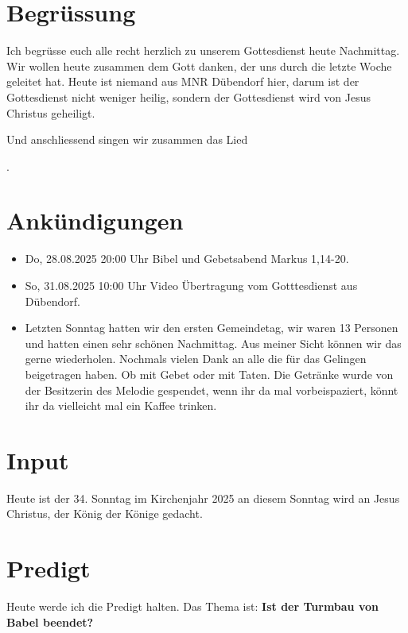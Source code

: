 \documentclass{../../inc/mybib}
\begin{document}
\section{Begrüssung}
Ich begrüsse euch alle recht herzlich zu unserem Gottesdienst heute Nachmittag. Wir wollen heute zusammen dem Gott danken, der uns durch die letzte Woche geleitet hat. Heute ist niemand aus MNR Dübendorf hier, darum ist der Gottesdienst nicht weniger heilig, sondern der Gottesdienst wird von Jesus Christus geheiligt.

\beten{} Und anschliessend singen wir zusammen das Lied

{}.

\section{Ankündigungen}
\begin{itemize}
    \item {} Do, 28.08.2025 20:00 Uhr Bibel und Gebetsabend Markus 1,14-20.
    \item {} So, 31.08.2025 10:00 Uhr Video Übertragung vom Gotttesdienst aus Dübendorf.
    \item {} Letzten Sonntag hatten wir den ersten Gemeindetag, wir waren 13 Personen und hatten einen sehr schönen Nachmittag. Aus meiner Sicht können wir das gerne wiederholen. Nochmals vielen Dank an alle die für das Gelingen beigetragen haben. Ob mit Gebet oder mit Taten. Die Getränke wurde von der Besitzerin des Melodie gespendet, wenn ihr da mal vorbeispaziert, könnt ihr da vielleicht mal ein Kaffee trinken.
\end{itemize}

\section{ Input }
\begin{spacing}{1.5}
   Heute ist der 34. Sonntag im Kirchenjahr 2025 an diesem Sonntag wird an Jesus Christus, der König der Könige gedacht. 
\end{spacing}

\section{Predigt}

Heute werde ich die Predigt halten. Das Thema ist: \textbf{Ist der Turmbau von Babel beendet?}
\end{document}
